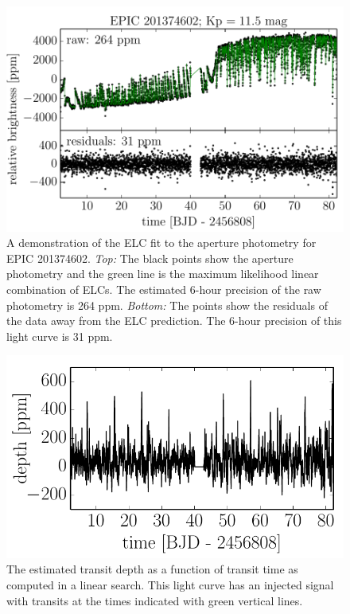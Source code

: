 \documentclass[12pt,preprint]{aastex}
\newcommand{\figlabel}[1]{\label{fig:#1}}
\begin{document}
\begin{figure}[p]
\begin{center}
\includegraphics{figures/corr.pdf}
\end{center}
\caption{%
A demonstration of the ELC fit to the aperture photometry for EPIC 201374602.
\emph{Top:} The black points show the aperture photometry and the green line
is the maximum likelihood linear combination of ELCs.
The estimated 6-hour precision of the raw photometry is 264 ppm.
\emph{Bottom:} The points show the residuals of the data away from the ELC
prediction.
The 6-hour precision of this light curve is 31 ppm.
\figlabel{corr}}
\end{figure}

\begin{figure}[p]
\begin{center}
\includegraphics{figures/linear.pdf}
\end{center}
\caption{%
The estimated transit depth as a function of transit time as computed in a
linear search.
This light curve has an injected signal with transits at the times indicated
with green vertical lines.
\figlabel{linear}}
\end{figure}
\end{document}

